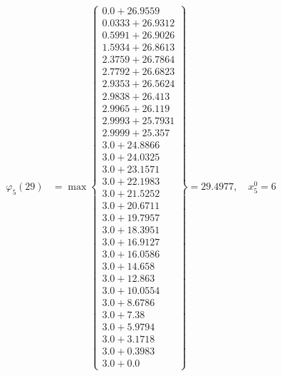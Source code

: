\documentclass{article}
\begin{document}
\begin{align*}
  
\varphi_{5}(29) &= \max \left\{ \begin{array}{c}
0.0 + 26.9559 \\
 0.0333 + 26.9312 \\
 0.5991 + 26.9026 \\
 1.5934 + 26.8613 \\
 2.3759 + 26.7864 \\
 2.7792 + 26.6823 \\
 2.9353 + 26.5624 \\
 2.9838 + 26.413 \\
 2.9965 + 26.119 \\
 2.9993 + 25.7931 \\
 2.9999 + 25.357 \\
 3.0 + 24.8866 \\
 3.0 + 24.0325 \\
 3.0 + 23.1571 \\
 3.0 + 22.1983 \\
 3.0 + 21.5252 \\
 3.0 + 20.6711 \\
 3.0 + 19.7957 \\
 3.0 + 18.3951 \\
 3.0 + 16.9127 \\
 3.0 + 16.0586 \\
 3.0 + 14.658 \\
 3.0 + 12.863 \\
 3.0 + 10.0554 \\
 3.0 + 8.6786 \\
 3.0 + 7.38 \\
 3.0 + 5.9794 \\
 3.0 + 3.1718 \\
 3.0 + 0.3983 \\
 3.0 + 0.0
\end{array} \right\}=29.4977,\quad x_{5}^0=6\\
  
  
  

\end{align*}
\end{document}
